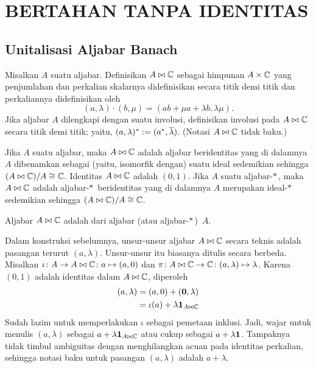 \chapter{BERTAHAN TANPA IDENTITAS}

\section{Unitalisasi Aljabar Banach}
\begin{defn}\label{00150005} Misalkan $A$ suatu aljabar. Definisikan
$A \bowtie \mathbb{C}$ sebagai himpunan $A \times \mathbb{C}$ yang penjumlahan dan perkalian skalarnya
didefinisikan secara titik demi titik dan perkaliannya didefinisikan oleh
  \[ (a,\lambda)\cdot(b,\mu) = (ab + \mu a + \lambda b, \lambda\mu). \]
Jika aljabar $A$ dilengkapi dengan suatu involusi, definisikan involusi pada $A \bowtie \mathbb{C}$
secara titik demi titik; yaitu, $(a,\lambda)^* := (a^*, \overline{\lambda})$. (Notasi $A \bowtie \mathbb{C}$
tidak baku.)
\end{defn}

\begin{prop}\label{0015001} Jika $A$ suatu aljabar, maka $A \bowtie \mathbb{C}$ adalah aljabar
beridentitas yang di dalamnya $A$ dibenamkan sebagai (yaitu, isomorfik dengan) suatu ideal
sedemikian sehingga $(A \bowtie \mathbb{C})/A \cong \mathbb{C}$. Identitas $A \bowtie \mathbb{C}$ adalah $(0,1)$. Jika
$A$ suatu aljabar-$*\,$, maka $A \bowtie \mathbb{C}$ adalah aljabar-$*\,$ beridentitas yang di dalamnya
$A$ merupakan ideal-$*\,$ sedemikian sehingga $(A \bowtie \mathbb{C})/A \cong \mathbb{C}$.
\end{prop}

\begin{defn} Aljabar $A \bowtie \mathbb{C}$ adalah
 dari aljabar (atau aljabar-$*\,$)~$A$.
\end{defn}

\begin{notn}\label{00150012} Dalam konstruksi sebelumnya, unsur-unsur aljabar
$A \bowtie \mathbb{C}$ secara teknis adalah pasangan terurut $(a,\lambda)$. Unsur-unsur itu biasanya
ditulis secara berbeda. Misalkan $\iota\colon A \rightarrow A \bowtie \mathbb{C} \colon a \mapsto (a,0)$ dan
$\pi\colon A \bowtie \mathbb{C} \rightarrow \mathbb{C}\colon (a,\lambda) \mapsto \lambda$. Karena $(0,1)$ adalah
identitas dalam $A \bowtie \mathbb{C}$, diperoleh
   \begin{align*} (a,\lambda) &= (a,0) + (\mathbf{0},\lambda) \\
                              &= \iota(a) + \lambda \mathbf{1}_{A \bowtie \mathbb{C}}
   \end{align*}
Sudah lazim untuk memperlakukan $\iota$ sebagai pemetaan inklusi. Jadi, wajar untuk
menulis $(a,\lambda)$ sebagai $a + \lambda \mathbf{1}_{A \bowtie \mathbb{C}}$ atau cukup sebagai
$a + \lambda \mathbf{1}$. Tampaknya tidak timbul ambiguitas dengan menghilangkan acuan pada
identitas perkalian, sehingga notasi baku untuk pasangan $(a,\lambda)$ adalah $a + \lambda$.
\end{notn}


